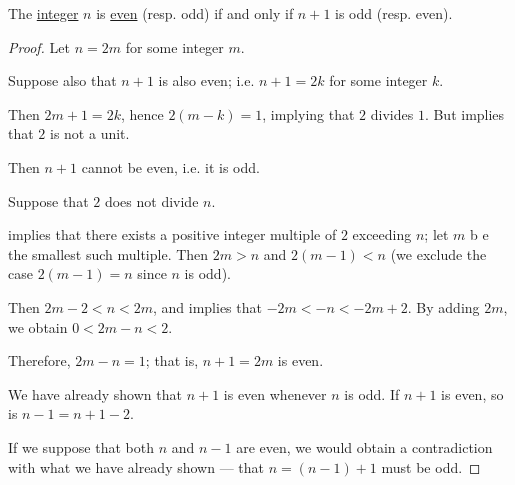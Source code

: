 \begin{lemma}\label{thm:integer_successor_parity}
  The \hyperref[def:integers]{integer} \( n \) is \hyperref[def:integer_parity]{even} (resp. odd) if and only if \( n + 1 \) is odd (resp. even).
\end{lemma}
\begin{comments}
\end{comments}
\begin{proof}
  \SufficiencySubProof
   Let \( n = 2m \) for some integer \( m \).

  Suppose also that \( n + 1 \) is also even; i.e. \( n + 1 = 2k \) for some integer \( k \).

  Then \( 2m + 1 = 2k \), hence \( 2(m - k) = 1 \), implying that \( 2 \) divides \( 1 \). But  implies that \( 2 \) is not a unit.

  Then \( n + 1 \) cannot be even, i.e. it is odd.

   Suppose that \( 2 \) does not divide \( n \).

   implies that there exists a positive integer multiple of \( 2 \) exceeding \( n \); let \( m \) b
  e the smallest such multiple. Then \( 2m > n \) and \( 2(m - 1) < n \) (we exclude the case \( 2(m - 1) = n \) since \( n \) is odd).

  Then \( 2m - 2 < n < 2m \), and  implies that \( -2m < -n < -2m + 2 \). By adding \( 2m \), we obtain \( 0 < 2m - n < 2 \).

  Therefore, \( 2m - n = 1 \); that is, \( n + 1 = 2m \) is even.

  \NecessitySubProof
   We have already shown that \( n + 1 \) is even whenever \( n \) is odd. If \( n + 1 \) is even, so is \( n - 1 = n + 1 - 2 \).

   If we suppose that both \( n \) and \( n - 1 \) are even, we would obtain a contradiction with what we have already shown --- that \( n = (n - 1) + 1 \) must be odd.
\end{proof}

